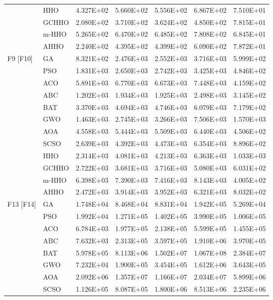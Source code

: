 \begin{longtable}{llrrrrr}
 & HHO & 4.327E+02 & 5.660E+02 & 5.556E+02 & 6.867E+02 & 7.510E+01 \\
 & GCHHO & 2.080E+02 & 3.710E+02 & 3.624E+02 & 4.850E+02 & 7.815E+01 \\
 & m-HHO & 5.265E+02 & 6.470E+02 & 6.485E+02 & 7.808E+02 & 6.845E+01 \\
 & AHHO & 2.240E+02 & 4.395E+02 & 4.399E+02 & 6.090E+02 & 7.872E+01 \\
\addlinespace
F9 [F10] & GA & 8.321E+02 & 2.476E+03 & 2.552E+03 & 3.716E+03 & 5.999E+02 \\
 & PSO & 1.831E+03 & 2.650E+03 & 2.742E+03 & 3.425E+03 & 4.846E+02 \\
 & ACO & 5.891E+03 & 6.770E+03 & 6.673E+03 & 7.448E+03 & 4.159E+02 \\
 & ABC & 1.202E+03 & 1.934E+03 & 1.925E+03 & 2.498E+03 & 3.145E+02 \\
 & BAT & 3.370E+03 & 4.694E+03 & 4.746E+03 & 6.079E+03 & 7.179E+02 \\
 & GWO & 1.463E+03 & 2.745E+03 & 3.266E+03 & 7.506E+03 & 1.570E+03 \\
 & AOA & 4.558E+03 & 5.444E+03 & 5.509E+03 & 6.440E+03 & 4.506E+02 \\
 & SCSO & 2.639E+03 & 4.392E+03 & 4.473E+03 & 6.354E+03 & 8.896E+02 \\
 & HHO & 2.314E+03 & 4.081E+03 & 4.213E+03 & 6.363E+03 & 1.033E+03 \\
 & GCHHO & 2.722E+03 & 3.681E+03 & 3.716E+03 & 5.080E+03 & 6.031E+02 \\
 & m-HHO & 6.398E+03 & 7.390E+03 & 7.416E+03 & 8.143E+03 & 4.005E+02 \\
 & AHHO & 2.472E+03 & 3.914E+03 & 3.952E+03 & 6.321E+03 & 8.032E+02 \\
\addlinespace
F13 [F14] & GA & 1.748E+04 & 8.468E+04 & 8.831E+04 & 1.942E+05 & 5.269E+04 \\
 & PSO & 1.992E+04 & 1.271E+05 & 1.402E+05 & 3.990E+05 & 1.006E+05 \\
 & ACO & 6.784E+03 & 1.977E+05 & 2.138E+05 & 5.599E+05 & 1.455E+05 \\
 & ABC & 7.632E+03 & 2.313E+05 & 3.597E+05 & 1.910E+06 & 3.970E+05 \\
 & BAT & 5.978E+05 & 8.113E+06 & 1.502E+07 & 1.067E+08 & 2.384E+07 \\
 & GWO & 7.232E+04 & 1.900E+05 & 3.454E+05 & 1.612E+06 & 3.643E+05 \\
 & AOA & 2.092E+06 & 1.357E+07 & 1.166E+07 & 2.034E+07 & 5.899E+06 \\
 & SCSO & 1.126E+05 & 8.087E+05 & 1.800E+06 & 8.513E+06 & 2.235E+06 \\

\end{longtable}
